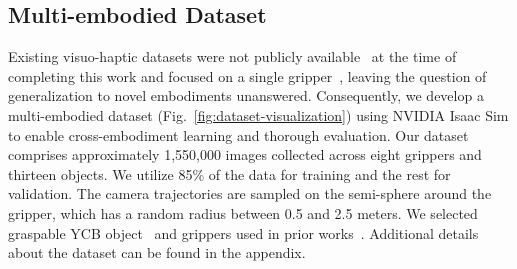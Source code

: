 \documentclass[11pt, a4paper, logo, twocolumn]{brown}
\begin{document}
\subsection{Multi-embodied Dataset}
\label{sec: dataset}
Existing visuo-haptic datasets were not publicly available~\cite{dikhale_visuotactile_2022, li_hypertaxel_2024, wan_vint-6d_2024} at the time of completing this work and focused on a single gripper~\cite{suresh_neuralfeels_2024}, leaving the question of generalization to novel embodiments unanswered.
Consequently, we develop a multi-embodied dataset (Fig.~\ref{fig:dataset-visualization}) using NVIDIA Isaac Sim to enable cross-embodiment learning and thorough evaluation.
Our dataset comprises approximately 1,550,000 images collected across eight grippers and thirteen objects.
We utilize 85\% of the data for training and the rest for validation.
The camera trajectories are sampled on the semi-sphere around the gripper, which has a random radius between 0.5 and 2.5 meters.
We selected graspable YCB object~\cite{calli_ycb_2015} and grippers used in prior works~\cite{ding_bunny-visionpro_2024, murrilo_multigrippergrasp_2024}.
Additional details about the dataset can be found in the appendix. 
\end{document}
